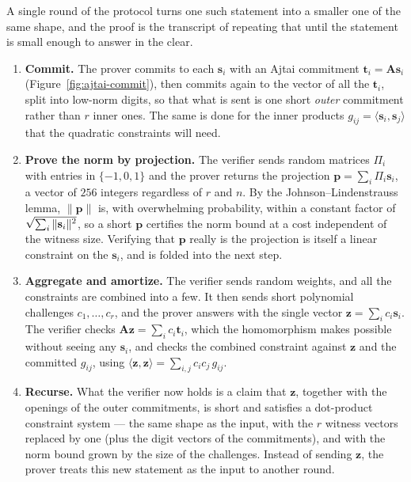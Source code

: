 A single round of the protocol turns one such statement into a smaller one of
the same shape, and the proof is the transcript of repeating that until the
statement is small enough to answer in the clear.

\begin{enumerate}
  \item \textbf{Commit.} The prover commits to each $\mathbf{s}_i$ with an
        Ajtai commitment $\mathbf{t}_i=\mathbf{A}\mathbf{s}_i$
        (Figure~\ref{fig:ajtai-commit}), then commits again to the vector of
        all the $\mathbf{t}_i$, split into low-norm digits, so that what is sent
        is one short \emph{outer} commitment rather than $r$ inner ones. The
        same is done for the inner products
        $g_{ij}=\langle\mathbf{s}_i,\mathbf{s}_j\rangle$ that the quadratic
        constraints will need.
  \item \textbf{Prove the norm by projection.} The verifier sends random
        matrices $\Pi_i$ with entries in $\{-1,0,1\}$ and the prover returns
        the projection $\mathbf{p}=\sum_i\Pi_i\mathbf{s}_i$, a vector of $256$
        integers regardless of $r$ and $n$. By the Johnson--Lindenstrauss
        lemma, $\|\mathbf{p}\|$ is, with overwhelming probability, within a
        constant factor of $\sqrt{\smash[b]{\textstyle\sum_i\|\mathbf{s}_i\|^2}}$,
        so a short $\mathbf{p}$ certifies the norm bound at a cost independent
        of the witness size. Verifying that $\mathbf{p}$ really is the
        projection is itself a linear constraint on the $\mathbf{s}_i$, and is
        folded into the next step.
  \item \textbf{Aggregate and amortize.} The verifier sends random weights, and
        all the constraints are combined into a few. It then sends short
        polynomial challenges $c_1,\dots,c_r$, and the prover answers with the
        single vector $\mathbf{z}=\sum_i c_i\mathbf{s}_i$. The verifier checks
        $\mathbf{A}\mathbf{z}=\sum_i c_i\mathbf{t}_i$, which the homomorphism
        makes possible without seeing any $\mathbf{s}_i$, and checks the
        combined constraint against $\mathbf{z}$ and the committed $g_{ij}$,
        using $\langle\mathbf{z},\mathbf{z}\rangle=\sum_{i,j}c_ic_j\,g_{ij}$.
  \item \textbf{Recurse.} What the verifier now holds is a claim that
        $\mathbf{z}$, together with the openings of the outer commitments, is
        short and satisfies a dot-product constraint system --- the same shape
        as the input, with the $r$ witness vectors replaced by one (plus the
        digit vectors of the commitments), and with the norm bound grown by
        the size of the challenges. Instead of sending $\mathbf{z}$, the prover
        treats this new statement as the input to another round.
\end{enumerate}


